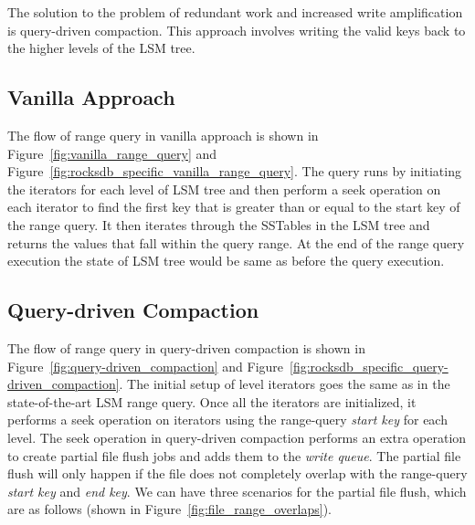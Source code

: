 
The solution to the problem of redundant work and increased write amplification is query-driven compaction. This 
approach involves writing the valid keys back to the higher levels of the LSM tree.

\subsection{Vanilla Approach}
The flow of range query in vanilla approach is shown in Figure~\ref{fig:vanilla_range_query} and 
Figure~\ref{fig:rocksdb_specific_vanilla_range_query}. The query runs by 
initiating the iterators for each level of LSM tree and then perform a seek operation on each iterator to find the 
first key that is greater than or equal to the start key of the range query. It then iterates through the
SSTables in the LSM tree and returns the values that fall within the query range. At the end of the range query
execution the state of LSM tree would be same as before the query execution.

\subsection{Query-driven Compaction}
The flow of range query in query-driven compaction is shown in Figure~\ref{fig:query-driven_compaction} and 
Figure~\ref{fig:rocksdb_specific_query-driven_compaction}. The initial 
setup of level iterators goes the same as in the state-of-the-art LSM range query. Once all the iterators are 
initialized, it performs a seek operation on iterators using the range-query \textit{start key} for each level. The seek 
operation in query-driven compaction performs an extra operation to create partial file flush jobs and adds them to the 
\textit{write queue}. The partial file flush will only happen if the file does not completely overlap with the range-query 
\textit{start key} and \textit{end key}. We can have three scenarios for the partial file flush, which 
are as follows (shown in Figure~\ref{fig:file_range_overlaps}).

